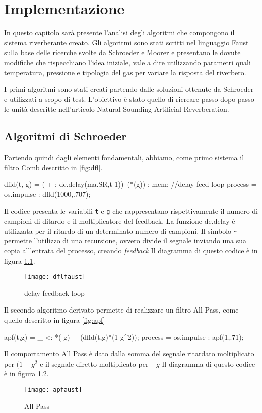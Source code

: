 
\chapter{Implementazione}
\label{chp:Implementazione}

In questo capitolo sarà presente l’analisi degli algoritmi che compongono il sistema riverberante creato. Gli algoritmi sono stati scritti nel linguaggio Faust sulla base delle ricerche svolte da Schroeder e Moorer e presentano le dovute modifiche che rispecchiano l’idea iniziale, vale a dire utilizzando parametri quali temperatura, pressione e tipologia del gas per variare la risposta del riverbero.

I primi algoritmi sono stati creati partendo dalle soluzioni ottenute da Schroeder e utilizzati a scopo di test. L’obiettivo è stato quello di ricreare passo dopo passo le unità descritte nell’articolo Natural Sounding Artificial Reverberation. 

\section{Algoritmi di Schroeder}
Partendo quindi dagli elementi fondamentali, abbiamo, come primo sistema il filtro Comb descritto in \ref{fig:dfl}.
\begin{code}
dfld(t, g) = ( + : de.delay(ma.SR,t-1))~(*(g)) : mem; //delay feed loop 
process = os.impulse : dfld(1000,.707);
\end{code}

Il codice presenta le variabili \verb!t! e \verb!g! che rappresentano rispettivamente il numero di campioni di ditardo e il moltiplicatore del feedback.
La funzione de.delay è utilizzata per il ritardo di un determinato numero di campioni.
Il simbolo \verb!~! permette l'utilizzo di una recursione, ovvero divide il segnale inviando una sua copia all'entrata del processo, creando \emph{feedback}
Il diagramma di questo codice è in figura \ref{fig:dflfaust}.

\bigskip

\begin{figure}[htp]
\centering
\texttt{[image: dflfaust]}
\caption{delay feedback loop}
\label{fig:dflfaust}
\end{figure}

Il secondo algoritmo derivato permette di realizzare un filtro All Pass, come quello descritto in figura \ref{fig:apf}
\begin{code}
apf(t,g) = _ <: *(-g) + (dfld(t,g)*(1-g^2));
process = os.impulse : apf(1,.71);
\end{code}

Il comportamento All Pass è dato dalla somma del segnale ritardato moltiplicato per $(1-g^2$ e il segnale diretto moltiplicato per $-g$
Il diagramma di questo codice è in figura \ref{fig:apfaust}.

\begin{figure}[htp]
\centering
\texttt{[image: apfaust]}
\caption{All Pass}
\label{fig:apfaust}
\end{figure}